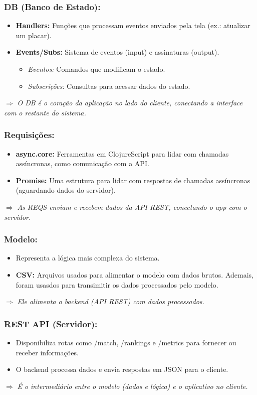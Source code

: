\documentclass[a4paper,times,12pt]{article}
\begin{document}
\subsubsection{DB (Banco de Estado):}
\begin{itemize}
  \item \textbf{Handlers:} Funções que processam eventos enviados pela tela (ex.: atualizar um placar).
  \item \textbf{Events/Subs:} Sistema de eventos (input) e assinaturas (output).
    \begin{itemize}
      \item \textit{Eventos:} Comandos que modificam o estado.
      \item \textit{Subscrições:} Consultas para acessar dados do estado.
    \end{itemize}
\end{itemize}
\noindent
\(\Rightarrow\) \textit{O DB é o coração da aplicação no lado do cliente, conectando a interface com o restante do sistema.}

\subsubsection{Requisições:}
\begin{itemize}
  \item \textbf{async.core:} Ferramentas em ClojureScript para lidar com chamadas assíncronas, como comunicação com a API.
  \item \textbf{Promise:} Uma estrutura para lidar com respostas de chamadas assíncronas (aguardando dados do servidor).
\end{itemize}
\noindent
\(\Rightarrow\) \textit{As REQS enviam e recebem dados da API REST, conectando o app com o servidor.}

\subsubsection{Modelo:}
\begin{itemize}
  \item Representa a lógica mais complexa do sistema.
  \item \textbf{CSV:} Arquivos usados para alimentar o modelo com dados brutos. Ademais, foram usasdos para transimitir os dados processados pelo modelo.
\end{itemize}
\noindent
\(\Rightarrow\) \textit{Ele alimenta o backend (API REST) com dados processados.}

\subsubsection{REST API (Servidor):}
\begin{itemize}
  \item Disponibiliza rotas como /match, /rankings e /metrics para fornecer ou receber informações.
  \item O backend processa dados e envia respostas em JSON para o cliente.
\end{itemize}
\noindent
\(\Rightarrow\) \textit{É o intermediário entre o modelo (dados e lógica) e o aplicativo no cliente.}
\end{document}
